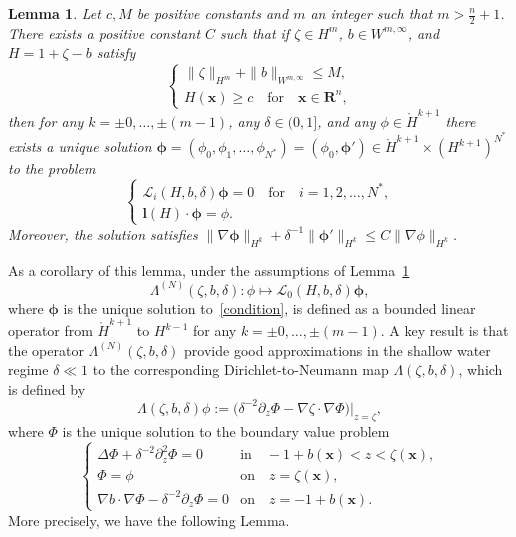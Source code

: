 \documentclass[11pt,leqno]{article}
\newtheorem{lemma}[theorem]{\bf Lemma}
\numberwithin{equation}{section}
\numberwithin{figure}{section}
\begin{document}
\begin{lemma}\label{L.L-invertible}
Let $c, M$ be positive constants and $m$ an integer such that $m>\frac{n}{2}+1$. 
There exists a positive constant $C$ such that if $\zeta\in H^m$, $b\in W^{m,\infty}$, and $H=1+\zeta-b$ satisfy 
%
\begin{equation}\label{eq-Hyp0}
\begin{cases}
 \|\zeta\|_{H^m}+\|b\|_{W^{m,\infty}}\leq M, \\
 H(\bm{x})\geq c \quad\mbox{for}\quad \bm{x}\in\mathbf{R}^n,
\end{cases}
\end{equation}
%
then for any $k=\pm 0,\dots, \pm(m-1)$, any $\delta\in(0,1]$, and any $\phi\in\mathring{H}^{k+1}$ 
there exists a unique solution $\bm{\phi}=(\phi_0,\phi_1,\ldots,\phi_{N^*})=(\phi_0,\bm{\phi}') 
\in \mathring{H}^{k+1}\times(H^{k+1})^{N^*}$ 
to the problem 
%
\begin{equation}\label{condition}
\begin{cases}
 \mathcal{L}_i(H,b,\delta){\bm \phi} = 0 \quad \mbox{for}\quad i=1,2,\ldots,N^*, \\
 {\bm l}(H)\cdot {\bm \phi} = \phi. 
\end{cases}
\end{equation}
%
Moreover, the solution satisfies 
$\|\nabla\bm{\phi}\|_{H^k} + \delta^{-1}\|\bm{\phi}'\|_{H^k} \leq C\|\nabla\phi\|_{H^k}$. 
\end{lemma}


As a corollary of this lemma, under the assumptions of Lemma~\ref{L.L-invertible} 
%
\[
\Lambda^{(N)}(\zeta,b,\delta) \colon \phi \mapsto \mathcal{L}_0(H,b,\delta)\bm{\phi}, 
\]
%
where $\bm{\phi}$ is the unique solution to~\eqref{condition}, is defined as a bounded linear operator 
from $\mathring{H}^{k+1}$ to $H^{k-1}$ for any $k=\pm 0,\dots, \pm(m-1)$. 
A key result is that the operator $\Lambda^{(N)}(\zeta,b,\delta)$ provide good approximations in the shallow water 
regime $\delta\ll1$ to the corresponding Dirichlet-to-Neumann map $\Lambda(\zeta,b,\delta)$, which is defined by 
%
\begin{equation}\label{def-DNmap}
\Lambda(\zeta,b,\delta)\phi := \big(\delta^{-2}\partial_z\Phi-\nabla\zeta\cdot\nabla\Phi\big)\big\vert_{z=\zeta},
\end{equation}
%
where $\Phi$ is the unique solution to the boundary value problem 
%
\begin{equation}\label{BVP}
\begin{cases}
\Delta\Phi + \delta^{-2}\partial_z^2\Phi = 0 & \mbox{in}\quad -1+b(\bm{x})<z<\zeta(\bm{x}), \\
\Phi=\phi& \mbox{on}\quad z=\zeta(\bm{x}), \\
\nabla b\cdot\nabla\Phi - \delta^{-2}\partial_z\Phi = 0 & \mbox{on}\quad z=-1+b(\bm{x}).
\end{cases}
\end{equation}
%
More precisely, we have the following Lemma. 
\end{document}
